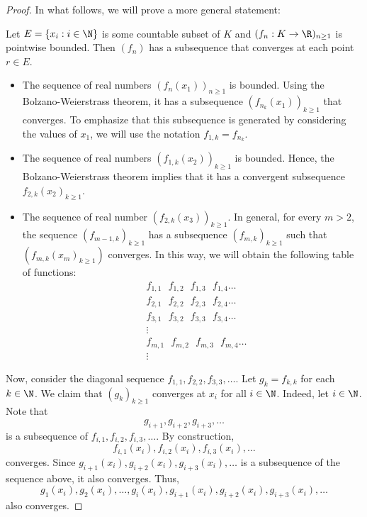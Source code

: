 \begin{proof}
In what follows, we will prove a more general statement:
\begin{center}
    Let \( E = \{ {x}_{i} : i \in \N  \}  \) is some countable subset of \( K  \) and \( ({f}_{n} : K \to \R )_{n \geq 1} \) is pointwise bounded. Then \( ({f}_{n}) \) has a subsequence that converges at each point \( r \in E  \). 
\end{center}
\begin{itemize}
    \item The sequence of real numbers \( ({f}_{n}({x}_{1}))_{n \geq 1} \) is bounded. Using the Bolzano-Weierstrass theorem, it has a subsequence \( ({f}_{{n}_{k }}({x}_{1}))_{k \geq 1} \) that converges. To emphasize that this subsequence is generated by considering the values of \( {x}_{1} \), we will use the notation \( {f}_{1,k} = {f}_{{n}_{k }} \). 
    \item The sequence of real numbers \( ({f}_{1,k}({x}_{2}))_{k \geq 1} \) is bounded. Hence, the Bolzano-Weierstrass theorem implies that it has a convergent subsequence \( {f}_{2,k}({x}_{2})_{k \geq 1} \). 
    \item The sequence of real number \( ({f}_{2,k}({x}_{3}))_{k \geq 1} \). In general, for every \( m > 2  \), the sequence \( ({f}_{m-1,k})_{k \geq 1} \) has a subsequence \( ({f}_{m,k })_{k \geq 1} \) such that \( ({f}_{m,k}({x}_{m})_{k \geq 1}) \) converges. In this way, we will obtain the following table of functions:
    \begin{align*}
        &{f}_{1,1}  \ \ \  {f}_{1,2} \ \ \   {f}_{1,3} \ \ \   {f}_{1,4} \dots  \\
        &{f}_{2,1} \  \ \   {f}_{2,2} \ \ \   {f}_{2,3} \ \ \  {f}_{2,4} \dots  \\
        &{f}_{3,1} \  \ \  {f}_{3,2} \ \ \   {f}_{3,3} \ \ \   {f}_{3,4} \dots  \\
        &\vdots \\
        &{f}_{m,1} \ \ \   {f}_{m,2} \ \ \   {f}_{m,3} \ \ \   {f}_{m,4} \dots  \\
        &\vdots
    \end{align*}
\end{itemize}
Now, consider the diagonal sequence \( {f}_{1,1} , {f}_{2,2}, {f}_{3,3}, \dots \). Let \( {g}_{k } = {f}_{k,k} \) for each \( k \in \N  \). We claim that \( ({g}_{k })_{k \geq 1} \) converges at \( {x}_{i} \) for all \( i \in \N  \). Indeed, let \( i \in \N  \). Note that 
\[  {g}_{i+1}, {g}_{i+2}, {g}_{i+3}, \dots  \]
is a subsequence of \( {f}_{i,1}, {f}_{i,2}, {f}_{i,3}, \dots \). By construction,  
\[  {f}_{i,1}({x}_{i}), {f}_{i,2}({x}_{i}), {f}_{i,3}({x}_{i}), \dots \]
converges. Since \( {g}_{i+1}({x}_{i}), {g}_{i+2}({x}_{i}), {g}_{i+3}({x}_{i}), \dots  \) is a subsequence of the sequence above, it also converges. Thus,   
\[  {g}_{1}({x}_{i}), {g}_{2}({x}_{i}), \dots, {g}_{i}({x}_{i}) , {g}_{i+1}({x}_{i}) , {g}_{i+2}({x}_{i}), {g}_{i+3}({x}_{i}) , \dots  \]
also converges.
\end{proof}



